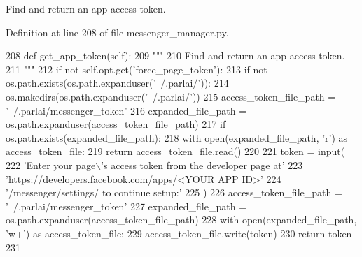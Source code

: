 \begin{DoxyVerb}Find and return an app access token.
\end{DoxyVerb}
 

Definition at line 208 of file messenger\+\_\+manager.\+py.


\begin{DoxyCode}
208     \textcolor{keyword}{def }get\_app\_token(self):
209         \textcolor{stringliteral}{"""}
210 \textcolor{stringliteral}{        Find and return an app access token.}
211 \textcolor{stringliteral}{        """}
212         \textcolor{keywordflow}{if} \textcolor{keywordflow}{not} self.opt.get(\textcolor{stringliteral}{'force\_page\_token'}):
213             \textcolor{keywordflow}{if} \textcolor{keywordflow}{not} os.path.exists(os.path.expanduser(\textcolor{stringliteral}{'~/.parlai/'})):
214                 os.makedirs(os.path.expanduser(\textcolor{stringliteral}{'~/.parlai/'}))
215             access\_token\_file\_path = \textcolor{stringliteral}{'~/.parlai/messenger\_token'}
216             expanded\_file\_path = os.path.expanduser(access\_token\_file\_path)
217             \textcolor{keywordflow}{if} os.path.exists(expanded\_file\_path):
218                 with open(expanded\_file\_path, \textcolor{stringliteral}{'r') as access\_token\_file:}
219 \textcolor{stringliteral}{                    }\textcolor{keywordflow}{return} access\_token\_file.read()
220 
221         token = input(
222             \textcolor{stringliteral}{'Enter your page\(\backslash\)'s access token from the developer page at'}
223             \textcolor{stringliteral}{'https://developers.facebook.com/apps/<YOUR APP ID>'}
224             \textcolor{stringliteral}{'/messenger/settings/ to continue setup:'}
225         )
226         access\_token\_file\_path = \textcolor{stringliteral}{'~/.parlai/messenger\_token'}
227         expanded\_file\_path = os.path.expanduser(access\_token\_file\_path)
228         with open(expanded\_file\_path, \textcolor{stringliteral}{'w+'}) \textcolor{keyword}{as} access\_token\_file:
229             access\_token\_file.write(token)
230         \textcolor{keywordflow}{return} token
231 
\end{DoxyCode}
\mbox{\label{classparlai_1_1chat__service_1_1services_1_1messenger_1_1messenger__manager_1_1MessengerManager_a305c58cba4b22f99274b81a9253a4ca9}} 
